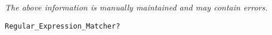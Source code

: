 \label{pkg:regex}

{\tiny \it The above information is manually maintained and may contain errors.}
\begin{verbatim}
Regular_Expression_Matcher?
\end{verbatim}
